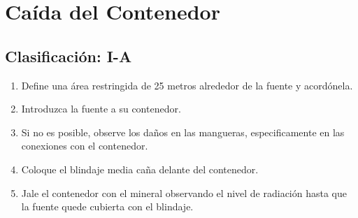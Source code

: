 \section{Caída del Contenedor}

\subsection*{Clasificación: I-A}

\begin{enumerate}
    \item Define una área restringida de 25 metros alrededor de la fuente y acordónela.
    \item Introduzca la fuente a su contenedor.
    \item Si no es posible, observe los daños en las mangueras, especificamente en las conexiones con el contenedor.
    \item Coloque el blindaje media caña delante del contenedor.
    \item Jale el contenedor con el mineral observando el nivel de radiación hasta que la fuente quede cubierta con el blindaje.
\end{enumerate}

